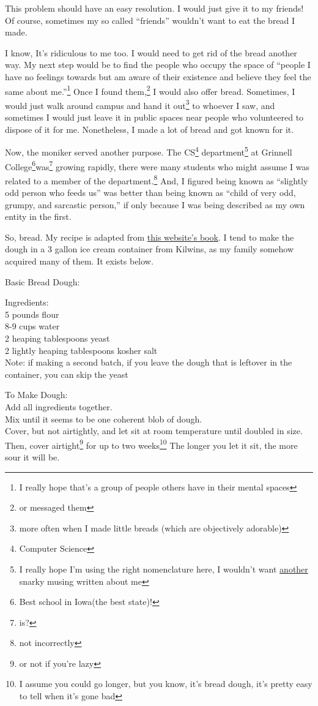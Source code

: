 \documentclass[12pt]{article}[titlepage]
\newcommand{\say}[1]{``#1''}
\newcommand{\1}{\={a}}
\newcommand{\2}{\={e}}
\newcommand{\3}{\={\i}}
\newcommand{\4}{\=o}
\newcommand{\5}{\=u}
\newcommand{\6}{\={A}}
\renewcommand{\,}{\textsuperscript{,}}
\begin{document}
This problem should have an easy resolution.
I would just give it to my friends!
Of course, sometimes my so called \say{friends} wouldn't want to eat the bread I made.

I know, It's ridiculous to me too.
I would need to get rid of the bread another way.
My next step would be to find the people who occupy the space of \say{people I have no feelings towards but am aware of their existence and believe they feel the same about me.}\footnote{I really hope that's a group of people others have in their mental spaces}
Once I found them,\footnote{or messaged them} I would also offer bread.
Sometimes, I would just walk around campus and hand it out\footnote{more often when I made little breads (which are objectively adorable)} to whoever I saw, and sometimes I would just leave it in public spaces near people who volunteered to dispose of it for me.
Nonetheless, I made a lot of bread and got known for it.

Now, the moniker served another purpose.
The CS\footnote{Computer Science} department\footnote{I really hope I'm using the right nomenclature here, I wouldn't want \href{http://www.cs.grinnell.edu/~rebelsky/musings/busses-bussing}{another} snarky musing written about me} at Grinnell College\footnote{Best school in Iowa(the best state)!}was\footnote{is?} growing rapidly, there were many students who might assume I was related to a member of the department.\footnote{not incorrectly}
And, I figured being known as \say{slightly odd person who feeds us} was better than being known as \say{child of very odd, grumpy, and sarcastic person,} if only because I was being described as my own entity in the first.

So, bread.
My recipe is adapted from \href{https://artisanbreadinfive.com}{this website's book}.
I tend to make the dough in a 3 gallon ice cream container from Kilwins, as my family somehow acquired many of them.
It exists below.

Basic Bread Dough:

Ingredients:\\
5 pounds flour\\
8-9 cups water\\
2 heaping tablespoons yeast\\
2 lightly heaping tablespoons kosher salt\\
Note: if making a second batch, if you leave the dough that is leftover in the container, you can skip the yeast

To Make Dough:\\
Add all ingredients together.\\
Mix until it seems to be one coherent blob of dough.\\
Cover, but not airtightly, and let sit at room temperature until doubled in size.\\
Then, cover airtight\footnote{or not if you're lazy} for up to two weeks\footnote{I assume you could go longer, but you know, it's bread dough, it's pretty easy to tell when it's gone bad}
The longer you let it sit, the more sour it will be.
\end{document}
